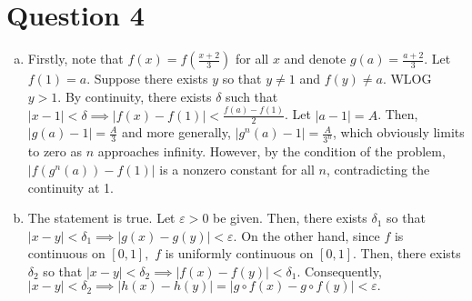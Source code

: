 \documentclass{article}
\begin{document}
\section*{Question 4}
\begin{enumerate}[(a)]
    \item Firstly, note that $f(x) = f(\frac{x+2}{3})$ for all $x$ and denote $g(a) = \frac{a+2}{3}$. Let $f(1) = a$. Suppose there exists $y$ so that $y \neq 1$ and $f(y) \neq a$. WLOG $y>1$. By continuity, there exists $\delta$ such that $|x-1| < \delta \implies |f(x)-f(1)| < \frac{f(a)-f(1)}{2}$. Let $|a-1| = A$. Then, $|g(a)-1| = \frac{A}{3}$ and more generally, $|g^n(a)-1| = \frac{A}{3^n}$, which obviously limits to zero as $n$ approaches infinity. However, by the condition of the problem, $|f(g^n(a))-f(1)|$ is a nonzero constant for all $n$, contradicting the continuity at 1.%
    \item The statement is true. Let $\varepsilon>0$ be given. Then, there exists $\delta_1$ so that $|x-y|<\delta_1\implies |g(x)-g(y)|<\varepsilon.$ On the other hand, since $f$ is continuous on $[0,1],$ $f$ is uniformly continuous on $[0,1].$ Then, there exists $\delta_2$ so that $|x-y|<\delta_2\implies |f(x)-f(y)|<\delta_1.$ Consequently, $|x-y|<\delta_2\implies |h(x)-h(y)|=|g\circ f(x)-g\circ f(y)|<\varepsilon.$
\end{enumerate}
\end{document}

